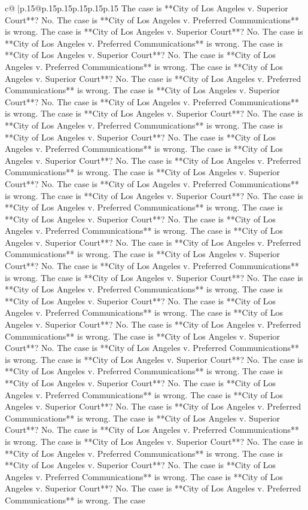 \documentclass{article}
\begin{document}
{\begin{supertabular}{c@{$\;$}|p{.15\linewidth}@{}p{.15\linewidth}p{.15\linewidth}p{.15\linewidth}p{.15\linewidth}p{.15\linewidth}}
{{{The case is **City of Los Angeles v. Superior Court**? No. The case is **City of Los Angeles v. Preferred Communications** is wrong. The case is **City of Los Angeles v. Superior Court**? No. The case is **City of Los Angeles v. Preferred Communications** is wrong. The case is **City of Los Angeles v. Superior Court**? No. The case is **City of Los Angeles v. Preferred Communications** is wrong. The case is **City of Los Angeles v. Superior Court**? No. The case is **City of Los Angeles v. Preferred Communications** is wrong. The case is **City of Los Angeles v. Superior Court**? No. The case is **City of Los Angeles v. Preferred Communications** is wrong. The case is **City of Los Angeles v. Superior Court**? No. The case is **City of Los Angeles v. Preferred Communications** is wrong. The case is **City of Los Angeles v. Superior Court**? No. The case is **City of Los Angeles v. Preferred Communications** is wrong. The case is **City of Los Angeles v. Superior Court**? No. The case is **City of Los Angeles v. Preferred Communications** is wrong. The case is **City of Los Angeles v. Superior Court**? No. The case is **City of Los Angeles v. Preferred Communications** is wrong. The case is **City of Los Angeles v. Superior Court**? No. The case is **City of Los Angeles v. Preferred Communications** is wrong. The case is **City of Los Angeles v. Superior Court**? No. The case is **City of Los Angeles v. Preferred Communications** is wrong. The case is **City of Los Angeles v. Superior Court**? No. The case is **City of Los Angeles v. Preferred Communications** is wrong. The case is **City of Los Angeles v. Superior Court**? No. The case is **City of Los Angeles v. Preferred Communications** is wrong. The case is **City of Los Angeles v. Superior Court**? No. The case is **City of Los Angeles v. Preferred Communications** is wrong. The case is **City of Los Angeles v. Superior Court**? No. The case is **City of Los Angeles v. Preferred Communications** is wrong. The case is **City of Los Angeles v. Superior Court**? No. The case is **City of Los Angeles v. Preferred Communications** is wrong. The case is **City of Los Angeles v. Superior Court**? No. The case is **City of Los Angeles v. Preferred Communications** is wrong. The case is **City of Los Angeles v. Superior Court**? No. The case is **City of Los Angeles v. Preferred Communications** is wrong. The case is **City of Los Angeles v. Superior Court**? No. The case is **City of Los Angeles v. Preferred Communications** is wrong. The case is **City of Los Angeles v. Superior Court**? No. The case is **City of Los Angeles v. Preferred Communications** is wrong. The case is **City of Los Angeles v. Superior Court**? No. The case is **City of Los Angeles v. Preferred Communications** is wrong. The case is **City of Los Angeles v. Superior Court**? No. The case is **City of Los Angeles v. Preferred Communications** is wrong. The case is **City of Los Angeles v. Superior Court**? No. The case is **City of Los Angeles v. Preferred Communications** is wrong. The case is **City of Los Angeles v. Superior Court**? No. The case is **City of Los Angeles v. Preferred Communications** is wrong. The case }}}
\end{supertabular}}
\end{document}
